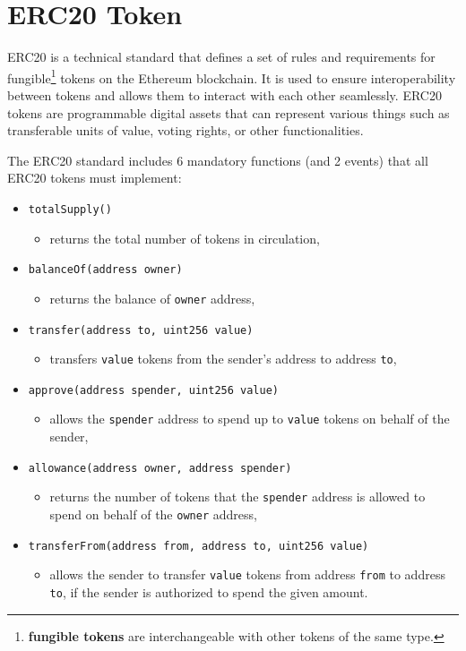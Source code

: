 \documentclass[12pt]{article}
\begin{document}
\afterpage{\cfoot{\thepage }}
\section{ERC20 Token}
\label{erc20}
ERC20 \cite{erc20-blog, erc20-doc} is a technical standard that defines a set of rules and requirements for fungible\footnote{\textbf{fungible tokens} are interchangeable with other tokens of the same type.} tokens on the Ethereum blockchain. It is used to ensure interoperability between tokens and allows them to interact with each other seamlessly. ERC20 tokens are programmable digital assets that can represent various things such as transferable units of value, voting rights, or other functionalities.

The ERC20 standard includes 6 mandatory functions (and 2 events) that all ERC20 tokens must implement:
            
\begin{itemize}
\item \texttt{totalSupply()}
\begin{itemize}
\item[] returns the total number of tokens in circulation,
\end{itemize}
\item \texttt{balanceOf(address owner)}
\begin{itemize}
\item[] returns the balance of \texttt{owner} address,
\end{itemize}
\item \texttt{transfer(address to, uint256 value)}
\begin{itemize}
\item[] transfers \texttt{value} tokens from the sender's address to address \texttt{to},
\end{itemize}
\item \texttt{approve(address spender, uint256 value)}
\begin{itemize}
\item[] allows the \texttt{spender} address to spend up to \texttt{value} tokens on behalf of the sender,
\end{itemize}
\item \texttt{allowance(address owner, address spender)}
\begin{itemize}
\item[] returns the number of tokens that the \texttt{spender} address is allowed to spend on behalf of the \texttt{owner} address,
\end{itemize}
\item \texttt{transferFrom(address from, address to, uint256 value)}
\begin{itemize}
\item[] allows the sender to transfer \texttt{value} tokens from address \texttt{from} to address \texttt{to}, if the sender is authorized to spend the given amount.
\end{itemize}
\end{itemize}
\end{document}
